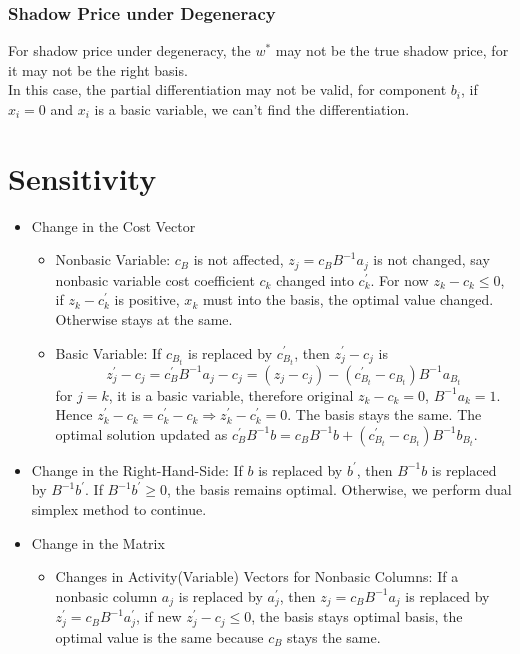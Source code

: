 					\subsubsection{Shadow Price under Degeneracy}
						For shadow price under degeneracy, the $w^*$ may not be the true shadow price, for it may not be the right basis.\\
						In this case, the partial differentiation may not be valid, for component $b_i$, if $x_i = 0$ and $x_i$ is a basic variable, we can't find the differentiation.

			\section{Sensitivity}
				\begin{itemize}
					\item Change in the Cost Vector
					\begin{itemize}
						\item Nonbasic Variable: $c_B$ is not affected, $z_j = c_BB^{-1}a_j$ is not changed, say nonbasic variable cost coefficient $c_k$ changed into $c_k^\prime$. For now $z_k - c_k \le 0$, if $z_k - c_k^\prime$ is positive, $x_k$ must into the basis, the optimal value changed. Otherwise stays at the same.
						\item Basic Variable: If $c_{B_t}$ is replaced by $c_{B_t}^\prime$, then $z_j^\prime -c_j$ is
						\begin{equation}
							z_j^\prime  - c_j = c_B^\prime B^{-1}a_j - c_j = (z_j - c_j) - (c_{B_t}^\prime -c_{B_t})B^{-1}a_{B_t} 
						\end{equation}
						for $j=k$, it is a basic variable, therefore original $z_k - c_k = 0$, $B^{-1}a_k=1$. Hence $z_k^\prime -c_k = c_k^\prime  - c_k \Rightarrow z_k^\prime  - c_k^\prime  = 0$. The basis stays the same. The optimal solution updated as $c_B^\prime B^{-1}b=c_BB^{-1}b + (c_{B_t}^\prime  - c_{B_t})B^{-1}b_{B_t}$.
					\end{itemize}
					\item Change in the Right-Hand-Side: If $b$ is replaced by $b^\prime$, then $B^{-1}b$ is replaced by $B^{-1}b^\prime$. If $B^{-1}b^\prime  \ge 0$, the basis remains optimal. Otherwise, we perform dual simplex method to continue.
					\item Change in the Matrix
					\begin{itemize}
						\item Changes in Activity(Variable) Vectors for Nonbasic Columns: If a nonbasic column $a_j$ is replaced by $a_j^\prime$, then $z_j=c_BB^{-1}a_j$ is replaced by $z_j^\prime =c_BB^{-1}a_j^\prime$, if new $z_j^\prime  - c_j \le 0$, the basis stays optimal basis, the optimal value is the same because $c_B$ stays the same.

\end{itemize}
\end{itemize}
